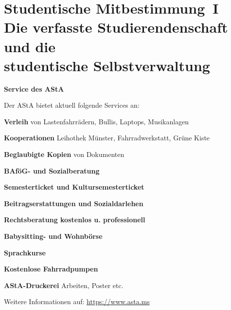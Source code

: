 \section[Studentische Mitbestimmung]{Studentische Mitbestimmung~I\\Die verfasste Studierendenschaft und die \\studentische Selbstverwaltung}
\label{studmit}

\begin{center}
	\begin{minipage}{0.60\textwidth}
	\end{minipage}
	\begin{minipage}{0.35\textwidth}
		\begin{center}
			\textbf{Service des AStA}
		\end{center}
		\footnotesize
		
		\medskip
				
		Der AStA bietet aktuell folgende Services an:
				
		\smallskip

		\textbf{Verleih} von Lastenfahrrädern, Bullis, Laptops, Musikanlagen
		
		\textbf{Kooperationen} Leihothek Münster, Fahrradwerkstatt, Grüne Kiste
		
		\textbf{Beglaubigte Kopien} von Dokumenten
		
		\textbf{BAföG- und Sozialberatung}
		
		\textbf{Semesterticket und Kultursemesterticket}
		
		\textbf{Beitragserstattungen und Sozialdarlehen}
		
		\textbf{Rechtsberatung kostenlos u. professionell}
		
		\textbf{Babysitting- und Wohnbörse}
		
		\textbf{Sprachkurse}
		
	        \textbf{Kostenlose Fahrradpumpen}
            	
		\textbf{AStA-Druckerei} Arbeiten, Poster etc.
		
		\medskip
		Weitere Informationen auf: \url{https://www.asta.ms}
	\end{minipage}
\end{center}

